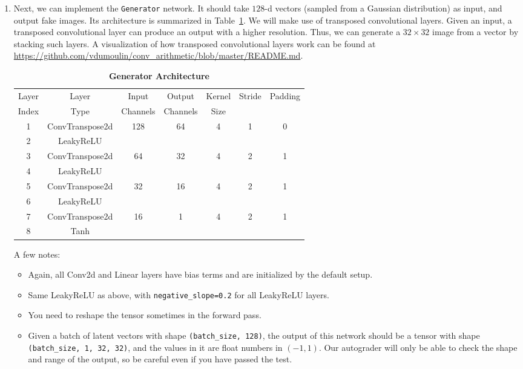 \begin{Q}
\begin{enumerate}
    \item Next, we can implement the \texttt{Generator} network. It should take $128$-d vectors (sampled from a Gaussian distribution) as input, and output fake images. Its architecture is summarized in Table~\ref{table:G}. We will make use of transposed convolutional layers. Given an input, a transposed convolutional layer can produce an output with a higher resolution. Thus, we can generate a $32\times 32$ image from a vector by stacking such layers. A visualization of how transposed convolutional layers work can be found at \url{https://github.com/vdumoulin/conv\_arithmetic/blob/master/README.md}.
    \begin{table}[H]
    \begin{center}
    \caption{\textbf{Generator Architecture}}
    \label{table:G}
    \begin{tabular}{ccccccc}
    \toprule
    Layer & Layer & Input & Output & Kernel & Stride & Padding \\
    Index & Type & Channels & Channels & Size & & \\
    \midrule
    1 & ConvTranspose2d & 128 & 64 & 4 & 1 & 0 \\
    2 & LeakyReLU \\
    \midrule
    3 & ConvTranspose2d & 64 & 32 & 4 & 2 & 1 \\
    4 & LeakyReLU \\
    \midrule
    5 & ConvTranspose2d & 32 & 16 & 4 & 2 & 1 \\
    6 & LeakyReLU \\
    \midrule
    7 & ConvTranspose2d & 16 & 1 & 4 & 2 & 1 \\
    8 & Tanh \\
    \bottomrule
    \end{tabular}
    \end{center}
    \end{table}
    A few notes:
    \begin{itemize}
        \item Again, all Conv2d and Linear layers have bias terms and are initialized by the default setup.
        \item Same LeakyReLU as above, with \texttt{negative\_slope=0.2} for all LeakyReLU layers.
        \item You need to reshape the tensor sometimes in the forward pass.
        \item Given a batch of latent vectors with shape \texttt{(batch\_size, 128)}, the output of this network should be a tensor with shape \texttt{(batch\_size, 1, 32, 32)}, and the values in it are float numbers in $(-1, 1)$. Our autograder will only be able to check the shape and range of the output, so be careful even if you have passed the test.
    \end{itemize}
    

\end{enumerate}
\end{Q}
